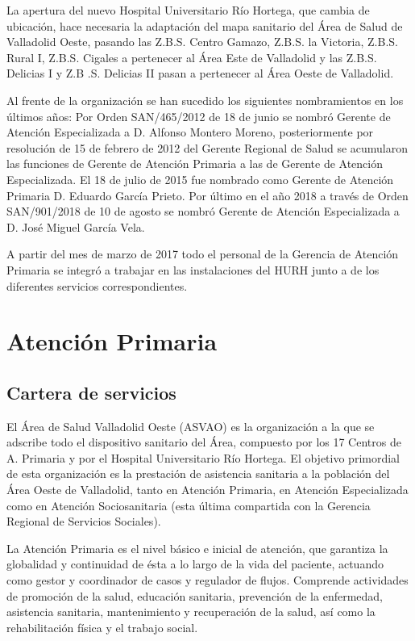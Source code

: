 La apertura del nuevo Hospital Universitario Río Hortega, que cambia de ubicación, hace necesaria la adaptación del mapa sanitario del Área de Salud de Valladolid Oeste, pasando las Z.B.S. Centro Gamazo, Z.B.S. la Victoria, Z.B.S. Rural I, Z.B.S. Cigales a pertenecer al Área Este de Valladolid y las Z.B.S. Delicias I y Z.B .S. Delicias II pasan a pertenecer al Área Oeste de Valladolid.

Al frente de la organización se han sucedido los siguientes nombramientos en los últimos años: Por Orden SAN/465/2012 de 18 de junio se nombró Gerente de Atención Especializada a D. Alfonso Montero Moreno, posteriormente por resolución de 15 de febrero de 2012 del Gerente Regional de Salud se acumularon las funciones de Gerente de Atención Primaria a las de Gerente de Atención Especializada. El 18 de julio de 2015 fue nombrado como Gerente de Atención Primaria D. Eduardo García Prieto. Por último en el año 2018 a través de Orden SAN/901/2018 de 10 de agosto se nombró Gerente de Atención Especializada a D. José Miguel García Vela.

A partir del mes de marzo de 2017 todo el personal de la Gerencia de Atención Primaria se integró a trabajar en las instalaciones del HURH junto a de los diferentes servicios correspondientes.

\section{Atención Primaria}

\subsection{Cartera de servicios}

El Área de Salud Valladolid Oeste (ASVAO) es la organización a la que se adscribe todo el dispositivo sanitario del Área, compuesto por los 17 Centros de A. Primaria y por el Hospital Universitario Río Hortega. El objetivo primordial de esta organización es la prestación de asistencia sanitaria a la población del Área Oeste de Valladolid, tanto en Atención Primaria, en Atención Especializada como en Atención Sociosanitaria (esta última compartida con la Gerencia Regional de Servicios Sociales).

La Atención Primaria es el nivel básico e inicial de atención, que garantiza la globalidad y continuidad de ésta a lo largo de la vida del paciente, actuando como gestor y coordinador de casos y regulador de flujos. Comprende actividades de promoción de la salud, educación sanitaria, prevención de la enfermedad, asistencia sanitaria, mantenimiento y recuperación de la salud, así como la rehabilitación física y el trabajo social.

